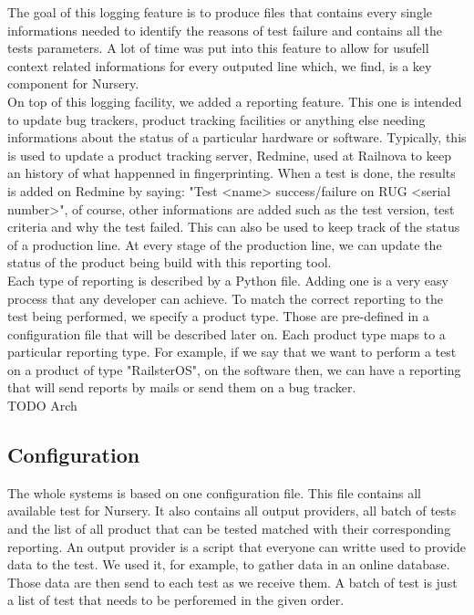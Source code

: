 \documentclass[12pt]{article}
\begin{document}
The goal of this logging feature is to produce files that contains every single informations needed to identify the reasons of test failure and contains all the tests parameters. A lot of time was put into this feature to allow for usufell context related informations for every outputed line which, we find, is a key component for Nursery.\\

On top of this logging facility, we added a reporting feature. This one is intended to update bug trackers, product tracking facilities or anything else needing informations about the status of a particular hardware or software. Typically, this is used to update a product tracking server, Redmine, used at Railnova to keep an history of what happenned in fingerprinting. When a test is done, the results is added on Redmine by saying: "Test <name> success/failure on RUG <serial number>", of course, other informations are added such as the test version, test criteria and why the test failed. This can also be used to keep track of the status of a production line. At every stage of the production line, we can update the status of the product being build with this reporting tool.\\

Each type of reporting is described by a Python file. Adding one is a very easy process that any developer can achieve. To match the correct reporting to the test being performed, we specify a product type. Those are pre-defined in a configuration file that will be described later on. Each product type maps to a particular reporting type. For example, if we say that we want to perform a test on a product of type "RailsterOS", on the software then, we can have a reporting that will send reports by mails or send them on a bug tracker.\\

TODO Arch

\subsection{Configuration}

The whole systems is based on one configuration file. This file contains all available test for Nursery. It also contains all output providers, all batch of tests and the list of all product that can be tested matched with their corresponding reporting. An output provider is a script that everyone can writte used to provide data to the test. We used it, for example, to gather data in an online database. Those data are then send to each test as we receive them. A batch of test is just a list of test that needs to be perforemed in the given order.\\
\end{document}

